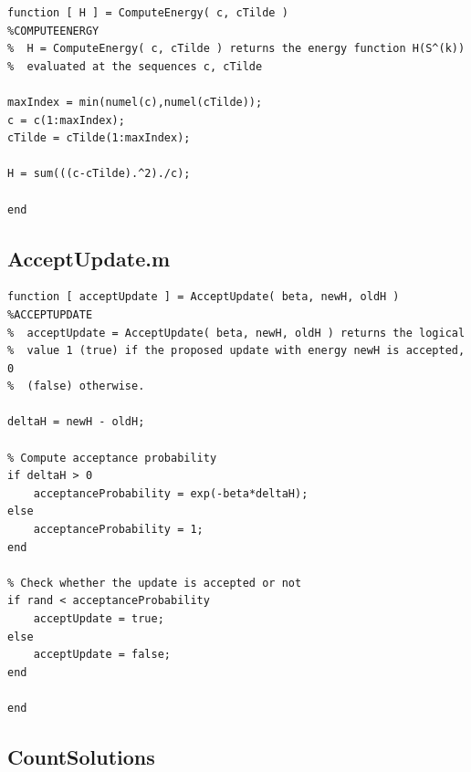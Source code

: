 \documentclass[12pt,A4,titlepage]{article}
\begin{document}
\begin{lstlisting}
function [ H ] = ComputeEnergy( c, cTilde )
%COMPUTEENERGY
%  H = ComputeEnergy( c, cTilde ) returns the energy function H(S^(k))
%  evaluated at the sequences c, cTilde

maxIndex = min(numel(c),numel(cTilde));
c = c(1:maxIndex);
cTilde = cTilde(1:maxIndex);

H = sum(((c-cTilde).^2)./c);

end
\end{lstlisting}



\subsection*{AcceptUpdate.m}

\begin{lstlisting}
function [ acceptUpdate ] = AcceptUpdate( beta, newH, oldH )
%ACCEPTUPDATE
%  acceptUpdate = AcceptUpdate( beta, newH, oldH ) returns the logical 
%  value 1 (true) if the proposed update with energy newH is accepted, 0
%  (false) otherwise.

deltaH = newH - oldH;

% Compute acceptance probability
if deltaH > 0
    acceptanceProbability = exp(-beta*deltaH);
else
    acceptanceProbability = 1;
end

% Check whether the update is accepted or not
if rand < acceptanceProbability
    acceptUpdate = true;
else
    acceptUpdate = false;
end

end
\end{lstlisting}



\subsection*{CountSolutions}
\end{document}
